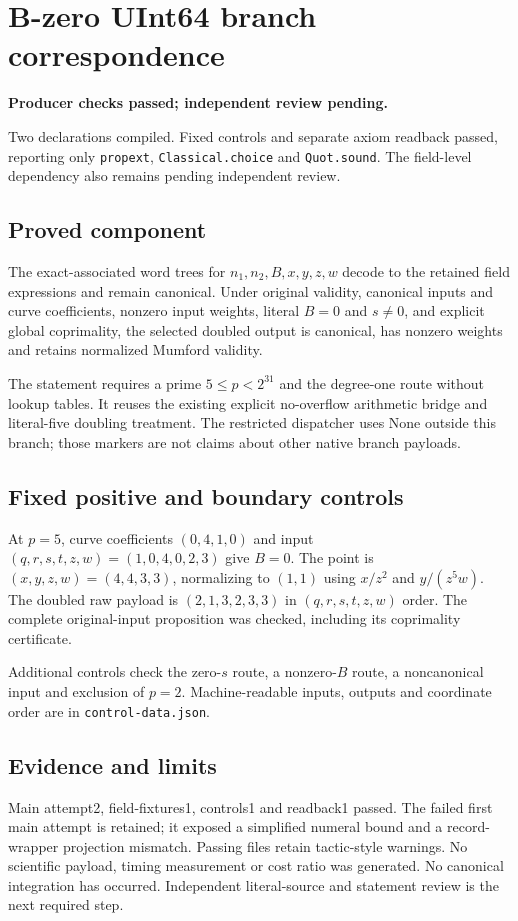 \documentclass[11pt]{article}
\begin{document}
\section*{B-zero UInt64 branch correspondence}
\textbf{Producer checks passed; independent review pending.}

Two declarations compiled. Fixed controls and separate axiom readback passed, reporting only \texttt{propext}, \texttt{Classical.choice} and \texttt{Quot.sound}. The field-level dependency also remains pending independent review.
\subsection*{Proved component}
The exact-associated word trees for $n_1,n_2,B,x,y,z,w$ decode to the retained field expressions and remain canonical. Under original validity, canonical inputs and curve coefficients, nonzero input weights, literal $B=0$ and $s\ne0$, and explicit global coprimality, the selected doubled output is canonical, has nonzero weights and retains normalized Mumford validity.

The statement requires a prime $5\le p<2^{31}$ and the degree-one route without lookup tables. It reuses the existing explicit no-overflow arithmetic bridge and literal-five doubling treatment. The restricted dispatcher uses None outside this branch; those markers are not claims about other native branch payloads.
\subsection*{Fixed positive and boundary controls}
At $p=5$, curve coefficients $(0,4,1,0)$ and input $(q,r,s,t,z,w)=(1,0,4,0,2,3)$ give $B=0$. The point is $(x,y,z,w)=(4,4,3,3)$, normalizing to $(1,1)$ using $x/z^2$ and $y/(z^5w)$. The doubled raw payload is $(2,1,3,2,3,3)$ in $(q,r,s,t,z,w)$ order. The complete original-input proposition was checked, including its coprimality certificate.

Additional controls check the zero-$s$ route, a nonzero-$B$ route, a noncanonical input and exclusion of $p=2$. Machine-readable inputs, outputs and coordinate order are in \texttt{control-data.json}.
\subsection*{Evidence and limits}
Main attempt2, field-fixtures1, controls1 and readback1 passed. The failed first main attempt is retained; it exposed a simplified numeral bound and a record-wrapper projection mismatch. Passing files retain tactic-style warnings. No scientific payload, timing measurement or cost ratio was generated. No canonical integration has occurred. Independent literal-source and statement review is the next required step.
\end{document}
